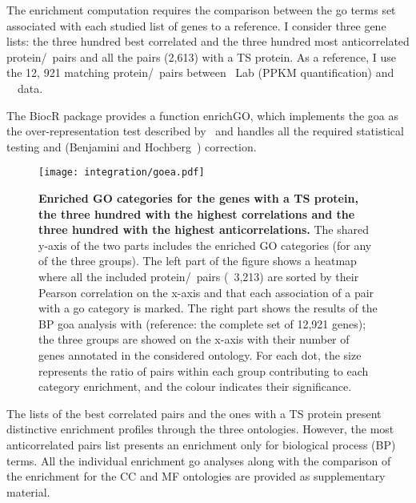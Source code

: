 The enrichment computation requires
the comparison between the \gls{go} terms set associated
with each studied list of genes to a reference.
I consider three gene lists:
the three hundred best correlated and
the three hundred most anticorrelated protein/\mRNA\ pairs
and all the pairs (2,613) with a \gls{TS} protein.
As a reference, I use the 12, 921 matching protein/\mRNA\ pairs
between \pandey\ Lab (\gls{PPKM} quantification) and \uhlen\ \etal\ data.

The \gls{BiocR} package 
provides a function \textsf{enrichGO},
which implements the \gls{goa} as the over-representation test
described by~\citet{Boyle2004-dh}
and handles all the required statistical testing
and (Benjamini and Hochberg~) correction.

    \begin{sidewaysfigure}
        \texttt{[image: integration/goea.pdf]}\centering
        \vspace{-3mm}
        \caption[Enriched GO categories for the genes with a TS protein and
        the three hundred with the highest correlations
        and anticorrelationss]{\label{fig:goares}%
        \textbf{Enriched GO categories for the genes with a TS protein,
        the three hundred with the highest correlations and
        the three hundred with the highest anticorrelations.}
        The shared y-axis of the two parts includes the enriched GO categories
        (for any of the three groups).
        The left part of the figure shows
        a heatmap where all the included protein/\mRNA\ pairs (\ie\ 3,213)
        are sorted by their Pearson correlation on the x-axis and
        that each association of a pair with a \gls{go} category is marked.
        The right part shows the results of the BP \gls{goa} analysis
        with  (reference: the complete set of 12,921 genes);
        the three groups are showed on the x-axis with their number of genes
        annotated in the considered ontology.
        For each dot, the size represents the ratio of pairs within each group
        contributing to each category enrichment,
        and the colour indicates their significance.
        }
    \end{sidewaysfigure}


The lists of the best correlated pairs and
the ones with a \gls{TS} protein present distinctive enrichment profiles
through the three ontologies.
However, the most anticorrelated pairs list presents
an enrichment only for biological process (BP) terms.
All the individual enrichment \gls{go} analyses
along with the comparison of the enrichment for the CC and MF ontologies
are provided as supplementary material.

